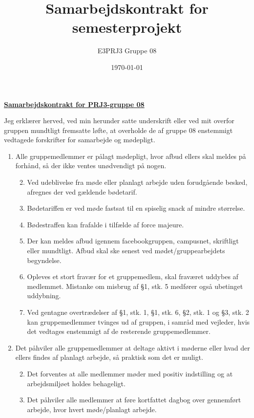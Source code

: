 \documentclass[a4paper,11pt,fleqn,dvipsnames,oneside,openright]{memoir} 	%
\title{Samarbejdskontrakt for semesterprojekt}
\author{E3PRJ3 Gruppe 08}
\date{\today{} \currenttime{}}
\begin{document}
\underline{ \huge \bfseries Samarbejdskontrakt for PRJ3-gruppe 08 \\[0.4cm] }

Jeg erklærer herved, ved min herunder satte underskrift eller ved mit overfor gruppen mundtligt fremsatte løfte, at overholde de af gruppe 08 enstemmigt vedtagede forskrifter for samarbejde og mødepligt.

\begin{enumerate}[label=\bfseries § \arabic*.]

	\item Alle gruppemedlemmer er pålagt mødepligt, hvor afbud ellers skal meldes på forhånd, så der ikke ventes unødvendigt på nogen.
		\begin{enumerate} [label=\bfseries stk. \arabic*:]
		\setcounter{enumii}{1}
		\item Ved udeblivelse fra møde eller planlagt arbejde uden forudgående besked, afregnes der ved gældende bødetarif.
		\item Bødetariffen er ved møde fastsat til en spiselig snack af mindre størrelse.
		\item Bødestraffen kan frafalde i tilfælde af force majeure.
		\item Der kan meldes afbud igennem facebookgruppen, campusnet, skriftligt eller mundtligt. Afbud skal ske senest ved mødet/gruppearbejdets begyndelse.
		\item Opleves et stort fravær for et gruppemedlem, skal fraværet uddybes af medlemmet. Mistanke om misbrug af §1, stk. 5 medfører også ubetinget uddybning.
		\item Ved gentagne overtrædelser af §1, stk. 1, §1, stk. 6, §2, stk. 1 og §3, stk. 2 kan gruppemedlemmer tvinges ud af gruppen, i samråd med vejleder, hvis det vedtages enstemmigt af de resterende gruppemedlemmer.
		\end{enumerate}
	
	\item Det påhviler alle gruppemedlemmer at deltage aktivt i møderne eller hvad der ellers findes af planlagt arbejde, så praktisk som det er muligt.
		\begin{enumerate} [label=\bfseries stk. \arabic*.]
		\setcounter{enumii}{1}
		\item Det forventes at alle medlemmer møder med positiv indstilling og at arbejdsmiljøet holdes behageligt.
		\item Det påhviler alle medlemmer at føre kortfattet dagbog over gennemført arbejde, hvor hvert møde/planlagt arbejde. 
		\end{enumerate}
		

\end{enumerate}
\end{document}
